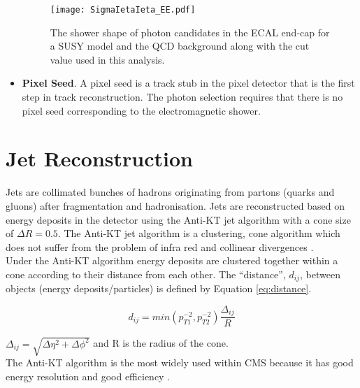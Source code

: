 \begin{itemize}
\begin{figure}
\begin{center}
\texttt{[image: SigmaIetaIeta\_EE.pdf]}
\end{center}
\caption{The shower shape of photon candidates in the ECAL end-cap for a SUSY 
model and the QCD background along with the cut value used in this analysis.} 
\label{fig:SigmaIetaIeta_EE}
\end{figure}

\item {\bf Pixel Seed}. A pixel seed is a track stub in the pixel detector that 
is the first step in track reconstruction. The photon selection requires that 
there is no pixel seed corresponding to the electromagnetic shower.
\end{itemize}

\section{Jet Reconstruction}

Jets are collimated bunches of hadrons originating from partons (quarks and 
gluons) after fragmentation and hadronisation. Jets are reconstructed based on 
energy deposits in the detector using the Anti-KT jet algorithm with a cone 
size of $\Delta R = 0.5$. The Anti-KT jet algorithm is a clustering, cone 
algorithm which does not suffer from the problem of infra red and collinear 
divergences \cite{antikt}. \\

Under the Anti-KT algorithm energy deposits are clustered together within a cone
according to their distance from each other. The ``distance'', $d_{ij}$, between 
objects (energy deposits/particles) is defined by Equation \ref{eq:distance}.

\begin{equation}
d_{ij} = min(p_{T1}^{-2}, p_{T2}^{-2})\frac{\Delta_{ij}}{R}
\label{eq:distance}
\end{equation}

$\Delta_{ij} = \sqrt{\Delta \eta^{2} + \Delta \phi^{2}}$ and R is the radius of
the cone. \\

The Anti-KT algorithm is the most widely used within CMS because it has good
energy resolution and good efficiency \cite{ak5best}.
